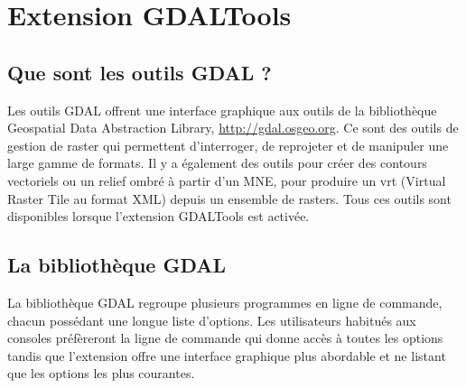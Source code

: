
\section{Extension GDALTools}\label{label_plugingdaltools}


\subsection{Que sont les outils GDAL ?}\label{whatsgdal}
Les outils GDAL offrent une interface graphique aux outils de la bibliothèque Geospatial Data Abstraction Library, \url{http://gdal.osgeo.org}. Ce sont des outils de gestion de raster qui permettent d'interroger, de reprojeter et de manipuler une large gamme de formats. Il y a également des outils pour créer des contours vectoriels ou un relief ombré à partir d'un MNE, pour produire un vrt (Virtual Raster Tile au format XML) depuis un ensemble de rasters. Tous ces outils sont disponibles lorsque l'extension GDALTools est activée.
\subsection{La bibliothèque GDAL}\label{gdal_lib}
La bibliothèque GDAL regroupe plusieurs programmes en ligne de commande, chacun possédant une longue liste d'options. Les utilisateurs habitués aux consoles préfèreront la ligne de commande qui donne accès à toutes les options tandis que l'extension offre une interface graphique plus abordable et ne listant que les options les plus courantes.

